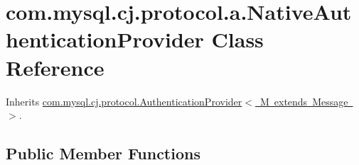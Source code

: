 \hypertarget{classcom_1_1mysql_1_1cj_1_1protocol_1_1a_1_1_native_authentication_provider}{}\section{com.\+mysql.\+cj.\+protocol.\+a.\+Native\+Authentication\+Provider Class Reference}
\label{classcom_1_1mysql_1_1cj_1_1protocol_1_1a_1_1_native_authentication_provider}


Inherits \mbox{\hyperlink{interfacecom_1_1mysql_1_1cj_1_1protocol_1_1_authentication_provider}{com.\+mysql.\+cj.\+protocol.\+Authentication\+Provider$<$ M extends Message $>$}}.

\subsection*{Public Member Functions}
